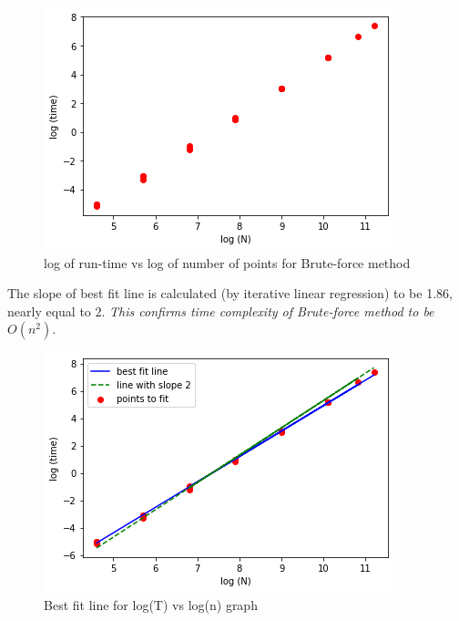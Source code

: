 \documentclass[twocolumn,11pt]{article}
\begin{document}
\begin{figure}[h]
\centering
	\includegraphics[width=0.9\linewidth]{brutelog}
	\caption{\small{log of run-time vs log of number of points for Brute-force method}}
	\label{fig6}
\end{figure}
The slope of best fit line is calculated (by iterative linear regression) to be 1.86, nearly equal to 2. \emph{This confirms time complexity of Brute-force method to be $O(n^{2})$}.
\begin{figure}[H]
\centering
	\includegraphics[width=0.9\linewidth]{brutefit}
	\caption{\small{Best fit line for log(T) vs log(n) graph}}
	\label{fig7}
\end{figure}
\end{document}
